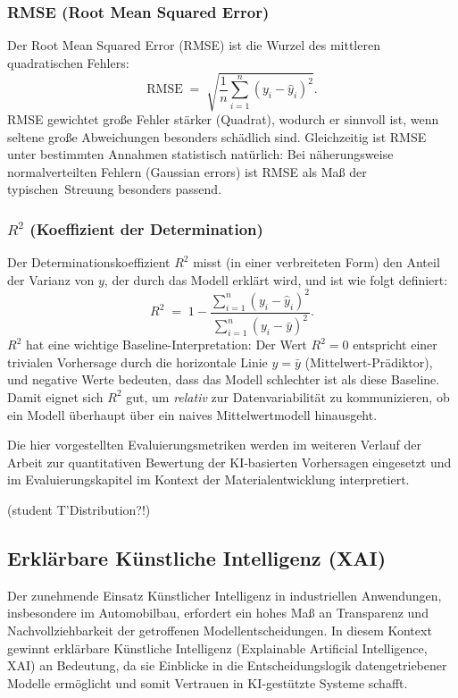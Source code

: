 \subsubsection{RMSE (Root Mean Squared Error)}
Der Root Mean Squared Error (RMSE) ist die Wurzel des mittleren quadratischen Fehlers:
\begin{equation}
	\mathrm{RMSE} \;=\; \sqrt{\frac{1}{n}\sum_{i=1}^{n}\left(y_i-\hat{y}_i\right)^2}.
\end{equation}
RMSE gewichtet große Fehler stärker (Quadrat), wodurch er sinnvoll ist, wenn seltene große Abweichungen besonders schädlich sind.
Gleichzeitig ist RMSE unter bestimmten Annahmen statistisch natürlich: Bei näherungsweise normalverteilten Fehlern (Gaussian errors) ist RMSE als Maß der \glqq typischen\grqq\ Streuung besonders passend. \cite{chai2014root}


\subsubsection{$R^2$ (Koeffizient der Determination)}
Der Determinationskoeffizient $R^2$ misst (in einer verbreiteten Form) den Anteil der Varianz von $y$, der durch das Modell erklärt wird, und ist wie folgt definiert:
\begin{equation}
	R^2 \;=\; 1 - \frac{\sum_{i=1}^{n}(y_i-\hat{y}_i)^2}{\sum_{i=1}^{n}(y_i-\bar{y})^2}.
\end{equation}
$R^2$ hat eine wichtige Baseline-Interpretation: Der Wert $R^2=0$ entspricht einer trivialen Vorhersage durch die horizontale Linie $y=\bar{y}$ (Mittelwert-Prädiktor), und negative Werte bedeuten, dass das Modell schlechter ist als diese Baseline. Damit eignet sich $R^2$ gut, um \emph{relativ} zur Datenvariabilität zu kommunizieren, ob ein Modell überhaupt über ein naives Mittelwertmodell hinausgeht. \cite{cameron1997r}

Die hier vorgestellten Evaluierungsmetriken werden im weiteren Verlauf der Arbeit zur quantitativen Bewertung der KI‑basierten Vorhersagen eingesetzt und im Evaluierungskapitel im Kontext der Materialentwicklung interpretiert.

(student T'Distribution?!)


\subsection{Erklärbare Künstliche Intelligenz (XAI)}
Der zunehmende Einsatz Künstlicher Intelligenz in industriellen Anwendungen, insbesondere im Automobilbau, erfordert ein hohes Maß an Transparenz und Nachvollziehbarkeit der getroffenen Modellentscheidungen. In diesem Kontext gewinnt erklärbare Künstliche Intelligenz (Explainable Artificial Intelligence, XAI) an Bedeutung, da sie Einblicke in die Entscheidungslogik datengetriebener Modelle ermöglicht und somit Vertrauen in KI‑gestützte Systeme schafft. \cite{dwivedi2023explainable}

